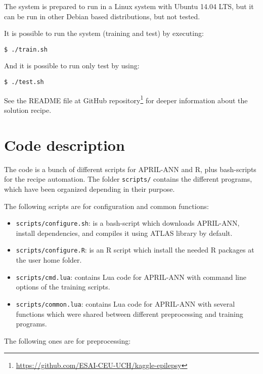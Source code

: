 \documentclass[a4paper,english,twoside]{article}
\begin{document}
The system is prepared to run in a Linux system with Ubuntu 14.04 LTS, but it
can be run in other Debian based distributions, but not tested.

It is possible to run the system (training and test) by executing:

\begin{verbatim}
$ ./train.sh
\end{verbatim}

\noindent And it is possible to run only test by using:

\begin{verbatim}
$ ./test.sh
\end{verbatim}

See the README file at GitHub
repository\footnote{\url{https://github.com/ESAI-CEU-UCH/kaggle-epilepsy}} for
deeper information about the solution recipe.

\section{Code description}\label{code-description}

The code is a bunch of different scripts for APRIL-ANN and R, plus bash-scripts
for the recipe automation. The folder \verb+scripts/+ contains the different
programs, which have been organized depending in their purpose.

The following scripts are for configuration and common functions:

\begin{itemize}
\item \verb+scripts/configure.sh+: is a bash-script which downloads APRIL-ANN,
  install dependencies, and compiles it using ATLAS library by default.
\item \verb+scripts/configure.R+: is an R script which install the needed
  R packages at the user home folder.
\item \verb+scripts/cmd.lua+: contains Lua code for APRIL-ANN with command
  line options of the training scripts.
\item \verb+scripts/common.lua+: contains Lua code for APRIL-ANN with several
  functions which were shared between different preprocessing and training
  programs.
\end{itemize}

The following ones are for preprocessing:
\end{document}
